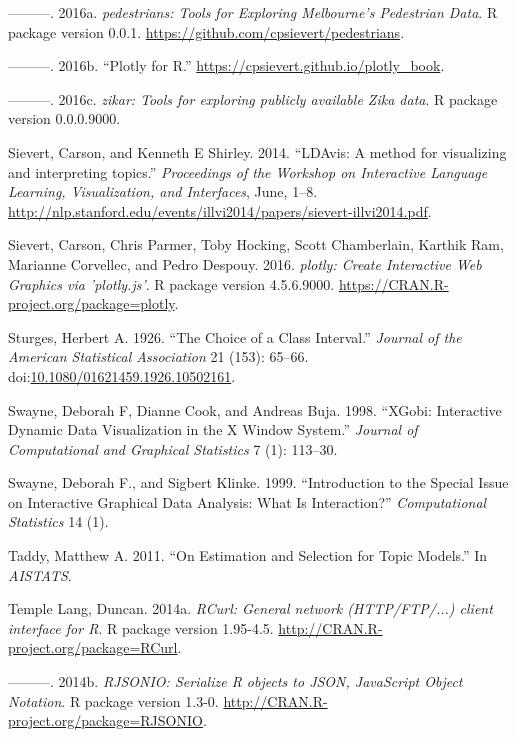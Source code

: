 \documentclass[12pt,]{isuthesis}
\begin{document}
\hypertarget{ref-pedestrians}{}
---------. 2016a. \emph{pedestrians: Tools for Exploring Melbourne's
Pedestrian Data}. R package version 0.0.1.
\url{https://github.com/cpsievert/pedestrians}.

\hypertarget{ref-plotly-book}{}
---------. 2016b. ``Plotly for R.''
\url{https://cpsievert.github.io/plotly_book}.

\hypertarget{ref-zikar}{}
---------. 2016c. \emph{zikar: Tools for exploring publicly available
Zika data}. R package version 0.0.0.9000.

\hypertarget{ref-Sievert:2014b}{}
Sievert, Carson, and Kenneth E Shirley. 2014. ``LDAvis: A method for
visualizing and interpreting topics.'' \emph{Proceedings of the Workshop
on Interactive Language Learning, Visualization, and Interfaces}, June,
1--8.
\url{http://nlp.stanford.edu/events/illvi2014/papers/sievert-illvi2014.pdf}.

\hypertarget{ref-plotly}{}
Sievert, Carson, Chris Parmer, Toby Hocking, Scott Chamberlain, Karthik
Ram, Marianne Corvellec, and Pedro Despouy. 2016. \emph{plotly: Create
Interactive Web Graphics via 'plotly.js'}. R package version 4.5.6.9000.
\url{https://CRAN.R-project.org/package=plotly}.

\hypertarget{ref-Sturges}{}
Sturges, Herbert A. 1926. ``The Choice of a Class Interval.''
\emph{Journal of the American Statistical Association} 21 (153): 65--66.
doi:\href{https://doi.org/10.1080/01621459.1926.10502161}{10.1080/01621459.1926.10502161}.

\hypertarget{ref-xgobi}{}
Swayne, Deborah F, Dianne Cook, and Andreas Buja. 1998. ``XGobi:
Interactive Dynamic Data Visualization in the X Window System.''
\emph{Journal of Computational and Graphical Statistics} 7 (1): 113--30.

\hypertarget{ref-swayne-klinke}{}
Swayne, Deborah F., and Sigbert Klinke. 1999. ``Introduction to the
Special Issue on Interactive Graphical Data Analysis: What Is
Interaction?'' \emph{Computational Statistics} 14 (1).

\hypertarget{ref-Taddy}{}
Taddy, Matthew A. 2011. ``On Estimation and Selection for Topic
Models.'' In \emph{AISTATS}.

\hypertarget{ref-RCurl}{}
Temple Lang, Duncan. 2014a. \emph{RCurl: General network (HTTP/FTP/...)
client interface for R}. R package version 1.95-4.5.
\url{http://CRAN.R-project.org/package=RCurl}.

\hypertarget{ref-RJSONIO}{}
---------. 2014b. \emph{RJSONIO: Serialize R objects to JSON, JavaScript
Object Notation}. R package version 1.3-0.
\url{http://CRAN.R-project.org/package=RJSONIO}.
\end{document}
